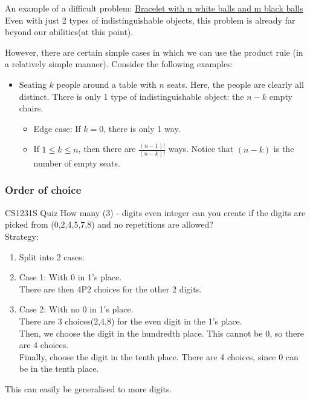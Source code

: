 \documentclass{article}
\begin{document}
An example of a difficult problem: 
\href{https://math.stackexchange.com/questions/710090/how-many-ways-to-make-a-bracelet-with-n-white-balls-and-m-black-balls?noredirect=1&lq=1}{Bracelet with n white balls and m black balls}\\
Even with just 2 types of indistinguishable objects, this problem is already far beyond our abilities(at this point).

However, there are certain simple cases in which we can use the product rule (in a relatively simple manner).
Consider the following examples:
\begin{itemize}
	\item Seating $k$ people around a table with $n$ seats. Here, the people are clearly all distinct. There is only 1 type of indistinguishable object: the $n-k$ empty chairs.
	\begin{itemize}
		\item Edge case: If $k=0$, there is only 1 way.
		\item If $1\leq k\leq n$, then there are $\frac{(n-1)!}{(n-k)!}$ ways. Notice that $(n-k)$ is the number of empty seats.
	\end{itemize}
\end{itemize}

\subsubsection{Order of choice}
CS1231S Quiz
How many (3) - digits even integer can you create if the digits are picked from ({0,2,4,5,7,8}) and no repetitions are allowed?\\
Strategy:
\begin{enumerate}
	\item Split into 2 cases: 
	\item Case 1: With $0$ in 1's place.\\
	There are then 4P2 choices for the other 2 digits.
	\item Case 2: With no $0$ in 1's place.\\
	There are $3$ choices(2,4,8) for the even digit in the 1's place.\\
	Then, we choose the digit in the hundredth place. This cannot be $0$, so there are $4$ choices.\\
	Finally, choose the digit in the tenth place. There are 4 choices, since $0$ can be in the tenth place.
\end{enumerate}
This can easily be generalised to more digits.
\end{document}
